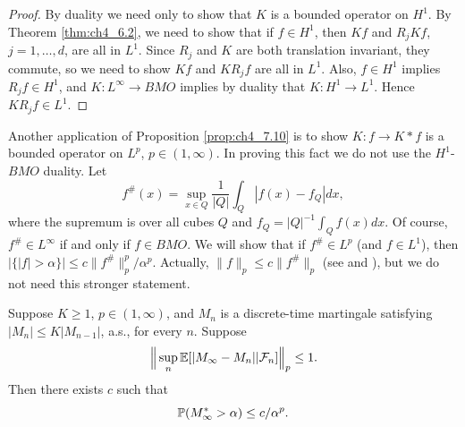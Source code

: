 \mpagebreak

\begin{proof}
By duality we need only to show that $K$ is a bounded operator on $H^1$. By Theorem \ref{thm:ch4_6.2}, we need to show that if $f \in H^1$, then $Kf$ and $R_jKf$, $j = 1,\ldots,d$, are all in $L^1$. Since $R_j$ and $K$ are both translation invariant, they commute, so we need to show $Kf$ and $KR_jf$ are all in $L^1$. Also, $f \in H^1$ implies $R_jf \in H^1$, and $K : L^\infty \to BMO$ implies by duality that $K : H^1 \to L^1$. Hence $KR_jf \in L^1$.
\end{proof}

Another application of Proposition \ref{prop:ch4_7.10} is to show $K : f \to K * f$ is a bounded operator on $L^p$, $p \in (1,\infty)$. In proving this fact we do not use the $H^1$-$BMO$ duality. Let
\[
    f^\#(x) = \sup_{x\in Q} \frac{1}{|Q|}\int_Q |f(x) - f_Q|dx,
\]
where the supremum is over all cubes $Q$ and $f_Q = |Q|^{-1}\int_Q f(x)dx$. Of course, $f^\# \in L^\infty$ if and only if $f \in BMO$. We will show that if $f^\# \in L^p$ (and $f \in L^1$), then $|\{|f| > \alpha\}| \leq c\|f^\#\|_p^p/\alpha^p$. Actually, $\|f\|_p \leq c\|f^\#\|_p$ (see \cite{FeffermanStein1972} and \cite{Garsia1973}), but we do not need this stronger statement.

\begin{lemma}\label{lem:ch4_7.19}
Suppose $K \geq 1$, $p \in (1,\infty)$, and $M_n$ is a discrete-time martingale satisfying $|M_n| \leq K|M_{n-1}|$, a.s., for every $n$. Suppose
\[
    \Big\|\sup_n \E[|M_\infty - M_n|\mid \FC_n]\Big\|_p \leq 1.
\]
Then there exists $c$ such that
\[
    \P(M_\infty^* > \alpha) \leq c/\alpha^p.
\]
\end{lemma}

